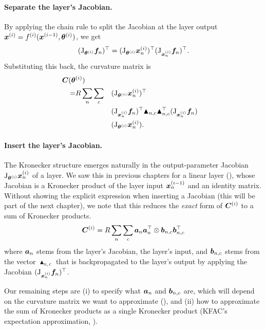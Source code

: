 \paragraph{Separate the layer's Jacobian.}
By applying the chain rule to split the Jacobian at the layer output ${\bm{x}}^{(i)} = f^{(i)}({\bm{x}}^{(i-1)}, {\bm{\theta}}^{(i)})$, we get
\begin{align*}
  (\mathrm{J}_{{\bm{\theta}}^{(i)}} {\bm{f}}_n)^{\top}
  =
  (\mathrm{J}_{{\bm{\theta}}^{(i)}} {\bm{x}}^{(i)}_n)^{\top}
  (\mathrm{J}_{{\bm{x}}_n^{(i)}} {\bm{f}}_n)^{\top}.
\end{align*}
Substituting this back, the curvature matrix is
\begin{align*}
  {\bm{C}}({\bm{\theta}}&^{(i)}) \\ =& R \sum_n \sum_{c}
                          &&(\mathrm{J}_{{\bm{\theta}}^{(i)}} {\bm{x}}^{(i)}_n)^{\top} \\
             & &&(\mathrm{J}_{{\bm{x}}_n^{(i)}} {\bm{f}}_n)^{\top}
                  \blacktriangle_{n,c}
                  \blacktriangle_{n,c}^{\top}
                  (\mathrm{J}_{{\bm{x}}_n^{(i)}} {\bm{f}}_n) \\
             & &&(\mathrm{J}_{{\bm{\theta}}^{(i)}} {\bm{x}}^{(i)}_n).
\end{align*}

\paragraph{Insert the layer's Jacobian.}
The Kronecker structure emerges naturally in the output-parameter Jacobian $\mathrm{J}_{{\bm{\theta}}^{(i)}} {\bm{x}}_n^{(i)}$ of a layer.
We saw this in previous chapters for a linear layer (), whose Jacobian is a Kronecker product of the layer input ${\bm{x}}^{(i-1)}_n$ and an identity matrix.
Without showing the explicit expression when inserting a Jacobian (this will be part of the next chapter), we note that this reduces the \emph{exact} form of ${\bm{C}}^{(i)}$ to a sum of Kronecker products.
\begin{align*}
  {\bm{C}}^{(i)} = R \sum_n \sum_c {\bm{a}}_n {\bm{a}}_n^{\top} \otimes {\bm{b}}_{n,c} {\bm{b}}_{n,c}^{\top}
\end{align*}
where ${\bm{a}}_n$ stems from the layer's Jacobian, \ie the layer's input, and ${\bm{b}}_{n,c}$ stems from the vector $\blacktriangle_{n,c}$ that is backpropagated to the layer's output by applying the Jacobian $(\mathrm{J}_{{\bm{x}}_n^{(i)}} {\bm{f}}_n)^{\top}$.

Our remaining steps are (i) to specify what ${\bm{a}}_n$ and ${\bm{b}}_{n,c}$ are, which will depend on the curvature matrix we want to approximate (), and (ii) how to approximate the sum of Kronecker products as a single Kronecker product (KFAC's expectation approximation, ).

